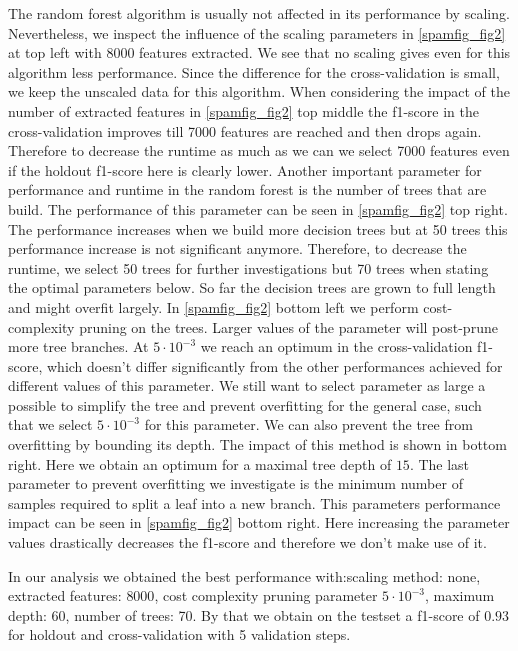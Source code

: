 \documentclass[11pt]{article}
\begin{document}
%
The random forest algorithm is usually not affected in its performance by scaling. Nevertheless, we inspect the influence of the scaling parameters in \ref{spamfig_fig2} at top left with 8000 features extracted. We see that no scaling gives even for this algorithm less performance. Since the difference for the cross-validation is small, we keep the unscaled data for this algorithm. When considering the impact of the number of extracted features in \ref{spamfig_fig2} top middle the f1-score in the cross-validation improves till 7000 features are reached and then drops again. Therefore to decrease the runtime as much as we can we select 7000 features even if the holdout f1-score here is clearly lower. Another important parameter for performance and runtime in the random forest is the number of trees that are build. The performance of this parameter can be seen in \ref{spamfig_fig2} top right. The performance increases when we build more decision trees but at 50 trees this performance increase is not significant anymore. Therefore, to decrease the runtime, we select 50 trees for further investigations but 70 trees when stating the optimal parameters below. So far the decision trees are grown to full length and might overfit largely. In \ref{spamfig_fig2} bottom left we perform cost-complexity pruning on the trees. Larger values of the parameter will post-prune more tree branches. At $5\cdot10^{-3}$ we reach an optimum in the cross-validation f1-score, which doesn't differ significantly from the other performances achieved for different values of this parameter. We still want to select parameter as large a possible to simplify the tree and prevent overfitting for the general case, such that we select $5\cdot10^{-3}$ for this parameter. We can also prevent the tree from overfitting by bounding its depth. The impact of this method is shown in \label{spamfig_fig2} bottom right. Here we obtain an optimum for a maximal tree depth of $15$. The last parameter to prevent overfitting we investigate is the minimum number of samples required to split a leaf into a new branch. This parameters performance impact can be seen in \ref{spamfig_fig2} bottom right. Here increasing the parameter values drastically decreases the f1-score and therefore we don't make use of it.

In our analysis we obtained the best performance with:scaling method: none, extracted features: $8000$, cost complexity pruning parameter $5\cdot10^{-3}$, maximum depth: $60$, number of trees: 70. By that we obtain on the testset a f1-score of $0.93$ for holdout and cross-validation with 5 validation steps.
\end{document}
